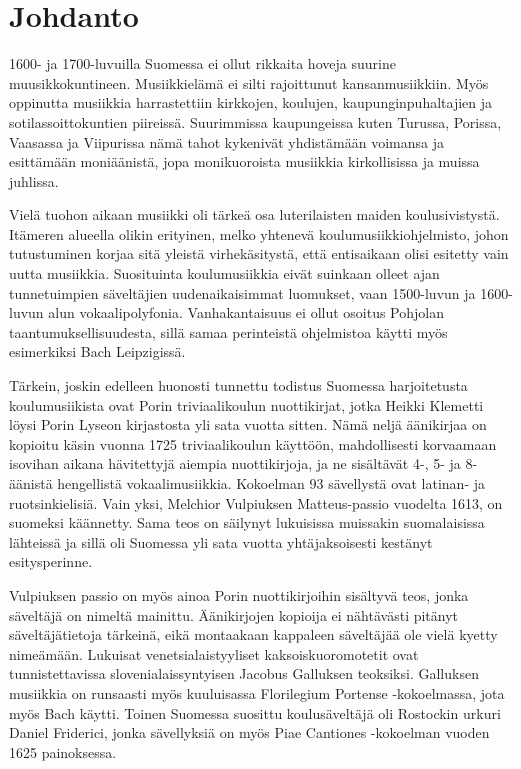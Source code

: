 \chapter*{Johdanto}

1600- ja 1700-luvuilla Suomessa ei ollut rikkaita hoveja suurine muusikkokuntineen. Musiikkielämä ei silti rajoittunut kansanmusiikkiin. Myös oppinutta musiikkia harrastettiin kirkkojen, koulujen, kaupunginpuhaltajien ja sotilassoittokuntien piireissä. Suurimmissa kaupungeissa kuten Turussa, Porissa, Vaasassa ja Viipurissa nämä tahot kykenivät yhdistämään voimansa ja esittämään moniäänistä, jopa monikuoroista musiikkia kirkollisissa ja muissa juhlissa.

Vielä tuohon aikaan musiikki oli tärkeä osa luterilaisten maiden koulusivistystä. Itämeren alueella olikin erityinen, melko yhtenevä koulumusiikkiohjelmisto, johon tutustuminen korjaa sitä yleistä virhekäsitystä, että entisaikaan olisi esitetty vain uutta musiikkia. Suosituinta koulumusiikkia eivät suinkaan olleet ajan tunnetuimpien säveltäjien uudenaikaisimmat luomukset, vaan 1500-luvun ja 1600-luvun alun vokaalipolyfonia. Vanhakantaisuus ei ollut osoitus Pohjolan taantumukselli­suudesta, sillä samaa perinteistä ohjelmistoa käytti myös esimerkiksi Bach Leipzigissä.

Tärkein, joskin edelleen huonosti tunnettu todistus Suomessa harjoitetusta koulumusiikista ovat Porin triviaalikoulun nuottikirjat, jotka Heikki Klemetti löysi Porin Lyseon kirjastosta yli sata vuotta sitten. Nämä neljä äänikirjaa on kopioitu käsin vuonna 1725 triviaalikoulun käyttöön, mahdollisesti korvaamaan isovihan aikana hävitettyjä aiempia nuottikirjoja, ja ne sisältävät 4-, 5- ja 8-äänistä hengellistä vokaalimusiikkia. Kokoelman 93 sävellystä ovat latinan- ja ruotsinkielisiä. Vain yksi, Melchior Vulpiuksen Matteus-passio vuodelta 1613, on suomeksi käännetty. Sama teos on säilynyt lukuisissa muissakin suomalaisissa lähteissä ja sillä oli Suomessa yli sata vuotta yhtäjaksoisesti kestänyt esitysperinne.

Vulpiuksen passio on myös ainoa Porin nuottikirjoihin sisältyvä teos, jonka säveltäjä on nimeltä mainittu. Äänikirjojen kopioija ei nähtävästi pitänyt säveltäjätietoja tärkeinä, eikä montaakaan kappaleen säveltäjää ole vielä kyetty nimeämään. Lukuisat venetsialaistyyliset kaksoiskuoromotetit ovat tunnistettavissa slovenialaissyntyisen Jacobus Galluksen teoksiksi. Galluksen musiikkia on runsaasti myös kuuluisassa Florilegium Portense -kokoelmassa, jota myös Bach käytti. Toinen Suomessa suosittu koulusäveltäjä oli Rostockin urkuri Daniel Friderici, jonka sävellyksiä on myös Piae Cantiones -kokoelman vuoden 1625 painoksessa.

